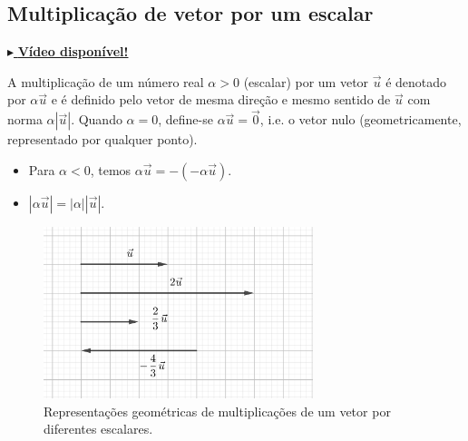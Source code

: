 \subsection{Multiplicação de vetor por um escalar}

\begin{flushright}
  \href{https://archive.org/details/multiplicacao-vetor-por-escalar}{$\blacktriangleright$ \bf Vídeo disponível!}
\end{flushright}

A multiplicação de um número real $\alpha>0$ (escalar) por um vetor $\vec{u}$ é denotado por $\alpha\vec{u}$ e é definido pelo vetor de mesma direção e mesmo sentido de $\vec{u}$ com norma $\alpha|\vec{u}|$. Quando $\alpha = 0$, define-se $\alpha\vec{u}=\vec{0}$, i.e. o vetor nulo (geometricamente, representado por qualquer ponto).

\begin{obs}
  \begin{itemize}
  \item Para $\alpha<0$, temos $\alpha\vec{u} = -(-\alpha\vec{u})$.
  \item $|\alpha\vec{u}|=|\alpha||\vec{u}|$.
\end{itemize}
\end{obs}

\begin{figure}[h!]
  \centering
  \includegraphics[width=0.7\textwidth]{./cap_vetor/dados/fig_vescalar/fig_vescalar}
  \caption{Representações geométricas de multiplicações de um vetor por diferentes escalares.}
  \label{fig:vescalar}
\end{figure}

